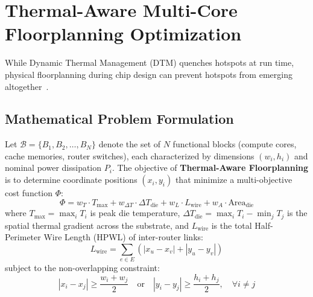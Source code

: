 \section{Thermal-Aware Multi-Core Floorplanning Optimization}
\label{sec:ch7_floorplanning}

While Dynamic Thermal Management (DTM) quenches hotspots at run time, physical floorplanning during chip design can prevent hotspots from emerging altogether~\cite{Zheng2025Thermal,Wang2011Variation}.

\subsection{Mathematical Problem Formulation}
Let $\mathcal{B} = \{B_1, B_2, \dots, B_N\}$ denote the set of $N$ functional blocks (compute cores, cache memories, router switches), each characterized by dimensions $(w_i, h_i)$ and nominal power dissipation $P_i$. The objective of \textbf{Thermal-Aware Floorplanning} is to determine coordinate positions $(x_i, y_i)$ that minimize a multi-objective cost function $\Phi$:
\begin{equation}
\Phi = w_T \cdot T_{\mathrm{max}} + w_{\Delta T} \cdot \Delta T_{\mathrm{die}} + w_L \cdot L_{\mathrm{wire}} + w_A \cdot \text{Area}_{\mathrm{die}}
\label{eq:ch7_floorplan_cost}
\end{equation}
where $T_{\mathrm{max}} = \max_i T_i$ is peak die temperature, $\Delta T_{\mathrm{die}} = \max_i T_i - \min_j T_j$ is the spatial thermal gradient across the substrate, and $L_{\mathrm{wire}}$ is the total Half-Perimeter Wire Length (HPWL) of inter-router links:
\begin{equation}
L_{\mathrm{wire}} = \sum_{e \in E} \left( |x_{u} - x_{v}| + |y_{u} - y_{v}| \right)
\label{eq:ch7_hpwl}
\end{equation}
subject to the non-overlapping constraint:
\begin{equation}
|x_i - x_j| \ge \frac{w_i + w_j}{2} \quad \text{or} \quad |y_i - y_j| \ge \frac{h_i + h_j}{2}, \quad \forall i \ne j
\end{equation}

